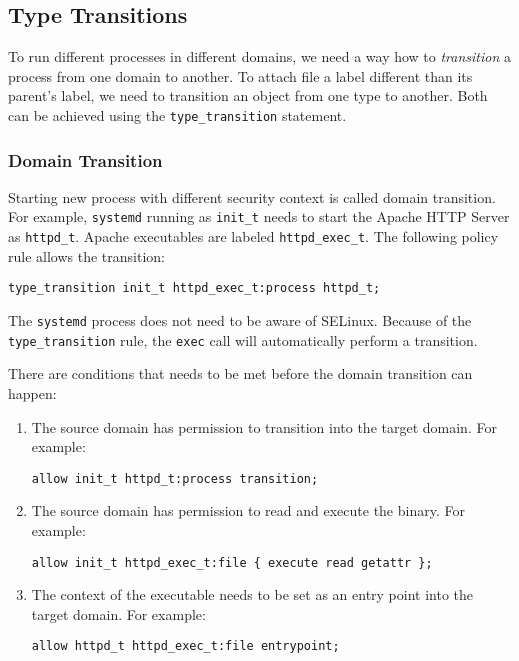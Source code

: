 \subsection{Type Transitions}

To run different processes in different domains, we need a way how to
\emph{transition} a process from one domain to another. To attach file a label
different than its parent's label, we need to transition an object from one type
to another. Both can be achieved using the \texttt{type\_transition} statement.

\subsubsection{Domain Transition}

Starting new process with different security context is called domain
transition. For example, \texttt{systemd} running as \texttt{init\_t} needs to
start the Apache HTTP Server as \texttt{httpd\_t}. Apache executables are
labeled \texttt{httpd\_exec\_t}. The following policy rule allows the
transition:
\begin{lstlisting}
type_transition init_t httpd_exec_t:process httpd_t;
\end{lstlisting}
The \texttt{systemd} process does not need to be aware of SELinux. Because of
the \texttt{type\_transition} rule, the \texttt{exec} call will automatically
perform a transition.

There are conditions that needs to be met before the domain transition can
happen:
\begin{enumerate}
    \item The source domain has permission to transition into the target domain.
        For example:
\begin{lstlisting}
allow init_t httpd_t:process transition;
\end{lstlisting}
    \item The source domain has permission to read and execute the binary. For
        example:
\begin{lstlisting}
allow init_t httpd_exec_t:file { execute read getattr };
\end{lstlisting}
    \item The context of the executable needs to be set as an entry point into
        the target domain. For example:
\begin{lstlisting}
allow httpd_t httpd_exec_t:file entrypoint;
\end{lstlisting}
\end{enumerate}

